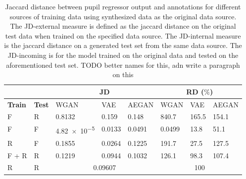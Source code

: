 \begin{table}[t]
    \centering
    \caption{Jaccard distance between pupil regressor output and annotations for different sources of training data using synthesized data as the original data source. The JD-external measure is defined as the jaccard distance on the original test data when trained on the specified data source. The JD-internal measure is the jaccard distance on a generated test set from the same data source. The JD-incoming is for the model trained on the original data and tested on the aforementioned test set. TODO better names for this, adn write a paragraph on this}
    \label{tab:quantitative_results}
    \begin{tabular}{|ll|lll|lll|}
        \cline{3-8}
        \multicolumn{2}{c}{ } & \multicolumn{3}{|c|}{JD} & \multicolumn{3}{c|}{RD ($\%$)} \\ \hline
        \textbf{Train} & \textbf{Test} & WGAN & VAE & AEGAN & WGAN & VAE & AEGAN \\ \hline
        F & R & \num{0.8132} & \num{0.159} & \num{0.148} & \num{840.7} & \num{165.5} & \num{154.1} \\
        F & F & \num{4.82e-5} & \num{0.0133} & \num{0.0491} & \num{0.0499} & \num{13.8} & \num{51.1} \\ 
        R & F & \num{0.1855} & \num{0.0264} & \num{0.1225} & \num{191.7}&\num{27.5} & \num{127.5} \\ 
        F + R & R & \num{0.1219} & \num{0.0944} & \num{0.1032} & \num{126.1} & \num{98.3} & \num{107.4} \\ 
        \hline
        R & R & \multicolumn{3}{c|}{\num{0.09607}} & \multicolumn{3}{c|}{\num{100}} \\
        \hline
    \end{tabular}
\end{table}

